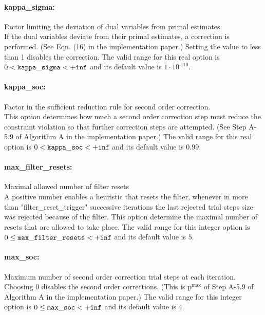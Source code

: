 \paragraph{kappa\_sigma:}\label{sec:kappa_sigma} Factor limiting the deviation of dual variables from primal estimates. $\;$ \\
 If the dual variables deviate from their primal
estimates, a correction is performed. (See Eqn.
(16) in the implementation paper.) Setting the
value to less than 1 disables the correction. The valid range for this real option is 
$0 <  {\tt kappa\_sigma } <  {\tt +inf}$
and its default value is $1 \cdot 10^{+10}$.


\paragraph{kappa\_soc:}\label{sec:kappa_soc} Factor in the sufficient reduction rule for second order correction. $\;$ \\
 This option determines how much a second order
correction step must reduce the constraint
violation so that further correction steps are
attempted.  (See Step A-5.9 of Algorithm A in the
implementation paper.) The valid range for this real option is 
$0 <  {\tt kappa\_soc } <  {\tt +inf}$
and its default value is $0.99$.


\paragraph{max\_filter\_resets:}\label{sec:max_filter_resets} Maximal allowed number of filter resets $\;$ \\
 A positive number enables a heuristic that resets
the filter, whenever in more than
"filter\_reset\_trigger" successive iterations
the last rejected trial steps size was rejected
because of the filter.  This option determine the
maximal number of resets that are allowed to take
place. The valid range for this integer option is
$0 \le {\tt max\_filter\_resets } <  {\tt +inf}$
and its default value is $5$.


\paragraph{max\_soc:}\label{sec:max_soc} Maximum number of second order correction trial steps at each iteration. $\;$ \\
 Choosing 0 disables the second order corrections.
(This is p$^{\max}$ of Step A-5.9 of Algorithm A in
the implementation paper.) The valid range for this integer option is
$0 \le {\tt max\_soc } <  {\tt +inf}$
and its default value is $4$.


